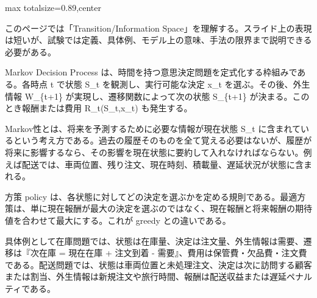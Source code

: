 \begin{minipage}[t]{0.58\textwidth}
\begin{adjustbox}{max totalsize={\textwidth}{0.89\textheight},center}
\begin{minipage}{\textwidth}\scriptsize
{}このページでは「Transition/Information Space」を理解する。スライド上の表現は短いが、試験では定義、具体例、モデル上の意味、手法の限界まで説明できる必要がある。\par
Markov Decision Process は、時間を持つ意思決定問題を定式化する枠組みである。各時点 t で状態 S\_t を観測し、実行可能な決定 x\_t を選ぶ。その後、外生情報 W\_\{t+1\} が実現し、遷移関数によって次の状態 S\_\{t+1\} が決まる。このとき報酬または費用 R\_t(S\_t,x\_t) も発生する。\par
Markov性とは、将来を予測するために必要な情報が現在状態 S\_t に含まれているという考え方である。過去の履歴そのものを全て覚える必要はないが、履歴が将来に影響するなら、その影響を現在状態に要約して入れなければならない。例えば配送では、車両位置、残り注文、現在時刻、積載量、遅延状況が状態に含まれる。\par
方策 policy は、各状態に対してどの決定を選ぶかを定める規則である。最適方策は、単に現在報酬が最大の決定を選ぶのではなく、現在報酬と将来報酬の期待値を合わせて最大にする。これが greedy との違いである。\par
具体例として在庫問題では、状態は在庫量、決定は注文量、外生情報は需要、遷移は『次在庫 = 現在在庫 + 注文到着 - 需要』、費用は保管費・欠品費・注文費である。配送問題では、状態は車両位置と未処理注文、決定は次に訪問する顧客または割当、外生情報は新規注文や旅行時間、報酬は配送収益または遅延ペナルティである。\par

\end{minipage}
\end{adjustbox}
\end{minipage}
